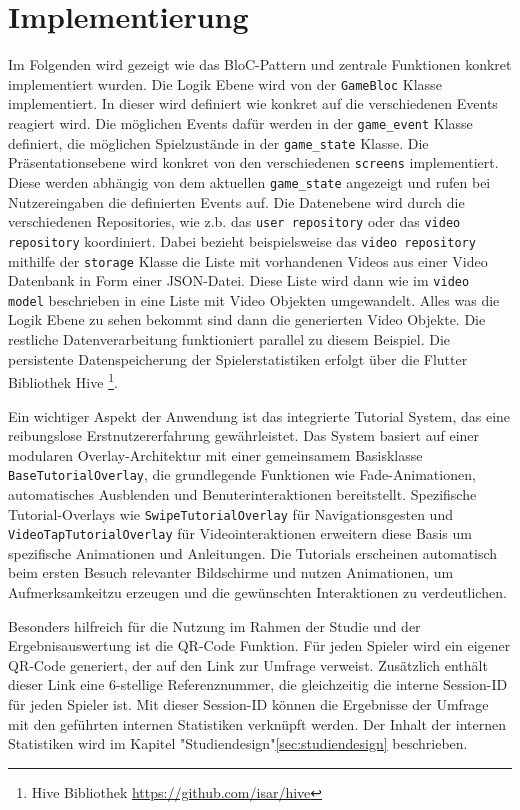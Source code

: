 \section{Implementierung} 
Im Folgenden wird gezeigt wie das BloC-Pattern und zentrale Funktionen konkret implementiert wurden. 
Die Logik Ebene wird von der \texttt{GameBloc} Klasse implementiert. 
In dieser wird definiert wie konkret auf die verschiedenen Events reagiert wird. 
Die möglichen Events dafür werden in der \texttt{game\_event} Klasse definiert, die möglichen Spielzustände in der \texttt{game\_state} Klasse.
Die Präsentationsebene wird konkret von den verschiedenen \texttt{screens} implementiert. 
Diese werden abhängig von dem aktuellen \texttt{game\_state} angezeigt und rufen bei Nutzereingaben die definierten Events auf. 
Die Datenebene wird durch die verschiedenen Repositories, wie z.b. das \texttt{user repository} oder das \texttt{video repository} koordiniert. 
Dabei bezieht beispielsweise das \texttt{video repository} mithilfe der \texttt{storage} Klasse die Liste mit vorhandenen Videos aus einer Video Datenbank in Form einer JSON-Datei. 
Diese Liste wird dann wie im \texttt{video model} beschrieben in eine Liste mit Video Objekten umgewandelt. 
Alles was die Logik Ebene zu sehen bekommt sind dann die generierten Video Objekte. 
Die restliche Datenverarbeitung funktioniert parallel zu diesem Beispiel.
Die persistente Datenspeicherung der Spielerstatistiken erfolgt über die Flutter Bibliothek Hive \footnote{
Hive Bibliothek
\url{https://github.com/isar/hive}
}.

Ein wichtiger Aspekt der Anwendung ist das integrierte Tutorial System, das eine reibungslose Erstnutzererfahrung gewährleistet. 
Das System basiert auf einer modularen Overlay-Architektur mit einer gemeinsamem Basisklasse \texttt{BaseTutorialOverlay}, 
die grundlegende Funktionen wie Fade-Animationen, automatisches Ausblenden und Benuterinteraktionen bereitstellt.
Spezifische Tutorial-Overlays wie \texttt{SwipeTutorialOverlay} für Navigationsgesten 
und \texttt{VideoTapTutorialOverlay} für Videointeraktionen erweitern diese Basis um spezifische Animationen und Anleitungen.
Die Tutorials erscheinen automatisch beim ersten Besuch relevanter Bildschirme und nutzen Animationen, 
um Aufmerksamkeitzu erzeugen und die gewünschten Interaktionen zu verdeutlichen.
 
Besonders hilfreich für die Nutzung im Rahmen der Studie und der Ergebnisauswertung ist die QR-Code Funktion. 
Für jeden Spieler wird ein eigener QR-Code generiert, der auf den Link zur Umfrage verweist. 
Zusätzlich enthält dieser Link eine 6-stellige Referenznummer, die gleichzeitig die interne Session-ID für jeden Spieler ist.
Mit dieser Session-ID können die Ergebnisse der Umfrage mit den geführten internen Statistiken verknüpft werden. 
Der Inhalt der internen Statistiken wird im Kapitel "Studiendesign"\ref{sec:studiendesign} beschrieben.

